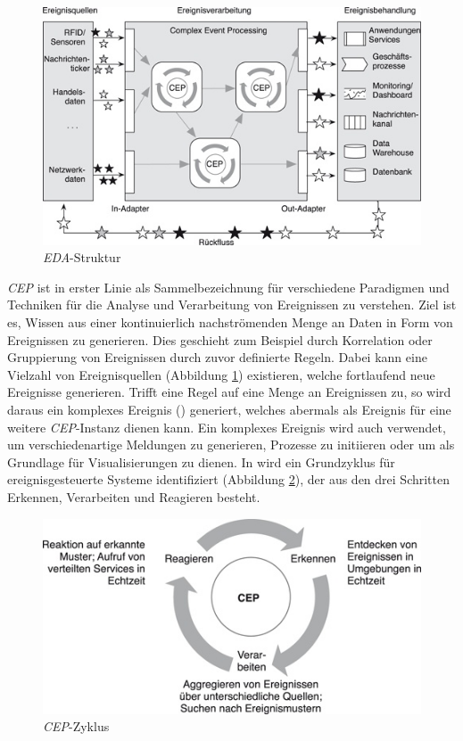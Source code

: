 \documentclass{acm_proc_article-sp}
\begin{document}
\begin{figure}[H]
    \centering
    \includegraphics[width=\linewidth]{img/eda-struktur-bruns.jpg}
    \caption{\textit{EDA}-Struktur}
    \label{img:eda-struktur}
\end{figure}

\textit{CEP} ist in erster Linie als Sammelbezeichnung für verschiedene Paradigmen und 
Techniken für die Analyse und Verarbeitung von Ereignissen zu verstehen. Ziel ist es, 
Wissen aus einer kontinuierlich nachströmenden Menge an Daten in Form von Ereignissen zu 
generieren. Dies geschieht zum Beispiel durch Korrelation oder Gruppierung von 
Ereignissen durch zuvor definierte Regeln. Dabei kann eine Vielzahl von 
Ereignisquellen (Abbildung \ref{img:eda-struktur}) existieren, welche fortlaufend neue 
Ereignisse generieren. Trifft eine Regel auf eine Menge an Ereignissen zu, so wird daraus 
ein komplexes Ereignis (\cite{glossary}) generiert, welches abermals als 
Ereignis für eine weitere 
\textit{CEP}-Instanz dienen kann. Ein komplexes Ereignis wird auch verwendet,
um verschiedenartige Meldungen zu generieren, Prozesse zu initiieren oder um als 
Grundlage 
für Visualisierungen zu dienen. In \cite{bruns} wird ein Grundzyklus für 
ereignisgesteuerte Systeme identifiziert (Abbildung \ref{img:cep-zyklus}), der aus den 
drei Schritten Erkennen, Verarbeiten und Reagieren besteht.

\begin{figure}[H]
    \centering
    \includegraphics[width=\linewidth]{img/cep-zyklus-bruns.jpg}
    \caption{\textit{CEP}-Zyklus}
    \label{img:cep-zyklus}
\end{figure}
\end{document}
